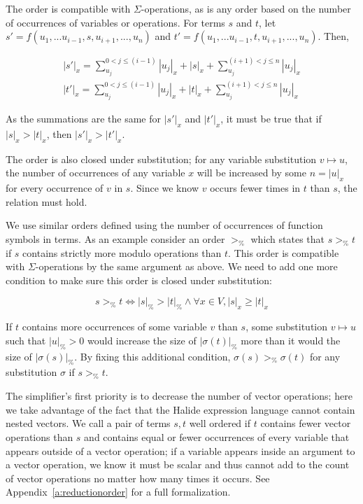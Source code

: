 \documentclass[sigplan,10pt,review,anonymous]{acmart}\settopmatter{printfolios=true,printccs=false,printacmref=false}
\begin{document}
The order is compatible with $\Sigma$-operations, as is any order based on the number of occurrences of variables or operations. For terms $s$ and $t$, let $s' = f(u_1,...u_{i-1},s,u_{i+1},...,u_n)$ and $t' = f(u_1,...u_{i-1},t,u_{i+1},...,u_n)$. Then, 

\begin{gather*}
|s'|_x = \sum_{u_j}^{0<j \leq (i-1)} |u_j|_x + |s|_x + \sum_{u_j}^{(i+1)<j \leq n} |u_j|_x \\
|t'|_x = \sum_{u_j}^{0<j \leq (i-1)} |u_j|_x + |t|_x + \sum_{u_j}^{(i+1)<j \leq n} |u_j|_x
\end{gather*}

As the summations are the same for $|s'|_x$ and $|t'|_x$, it must be true that if $|s|_x > |t|_x$, then $|s'|_x > |t'|_x$.

The order is also closed under substitution; for any variable substitution
$v \mapsto u$, the number of occurrences of any variable $x$ will be increased
by some $n = |u|_x$ for every occurrence of $v$ in $s$. Since we know $v$ occurs
fewer times in $t$ than $s$, the relation must hold.

We use similar orders defined using the number of occurrences of function symbols in terms. As an example consider an order $>_{\texttt{\%}}$ which states that $s >_{\texttt{\%}} t$ if $s$ contains strictly more modulo operations than $t$. This order is compatible with $\Sigma$-operations by the same argument as above. We need to add one more condition to make sure this order is closed under substitution:

\begin{equation*}
s >_{\texttt{\%}} t \iff |s|_{\texttt{\%}} > |t|_{\texttt{\%}} \wedge \forall x \in V, |s|_x \geq |t|_x
\end{equation*}

If $t$ contains more occurrences of some variable $v$ than $s$, some substitution $v \mapsto u$ such that $|u|_{\texttt{\%}} > 0$ would increase the size of $|\sigma(t)|_{\texttt{\%}}$ more than it would the size of $|\sigma(s)|_{\texttt{\%}}$. By fixing this additional condition, $\sigma(s) >_{\texttt{\%}} \sigma(t)$ for any substitution $\sigma$ if $s >_{\texttt{\%}} t$.

 The simplifier's first priority is to decrease the number of vector operations; here we take advantage of the fact that the Halide expression language cannot contain nested vectors. We call a pair of terms $s, t$ well ordered if $t$ contains fewer vector operations than $s$ and contains equal or fewer occurrences of every variable that appears outside of a vector operation; if a variable appears inside an argument to a vector operation, we know it must be scalar and thus cannot add to the count of vector operations no matter how many times it occurs. See Appendix~\ref{a:reductionorder} for a full formalization.
\end{document}
